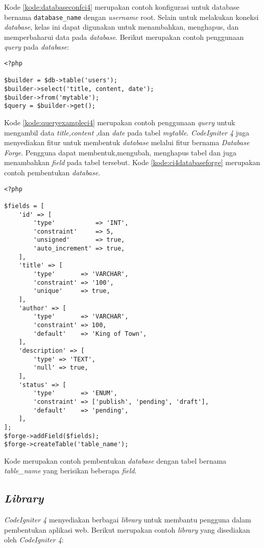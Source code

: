 Kode \ref{kode:databaseconfci4} merupakan contoh konfigurasi untuk database bernama \verb|database_name| dengan \textit{username} root. Selain untuk melakukan koneksi \textit{database}, kelas ini dapat digunakan untuk menambahkan, menghapus, dan memperbaharui data pada \textit{database}. Berikut merupakan contoh penggunaan \textit{query} pada \textit{database}:

\begin{lstlisting}[caption=Contoh konfigurasi \textit{database} pada \textit{CodeIgniter 4}. ,label=kode:queryexampleci4]
<?php

$builder = $db->table('users');
$builder->select('title, content, date');
$builder->from('mytable');
$query = $builder->get();
\end{lstlisting}
Kode \ref{kode:queryexampleci4} merupakan contoh penggunaan \textit{query} untuk mengambil data \textit{title,content} ,dan \textit{date} pada tabel \textit{mytable}. \textit{CodeIgniter 4} juga menyediakan fitur untuk membentuk \textit{database} melalui fitur bernama \textit{Database Forge}. Pengguna dapat membentuk,mengubah, menghapus tabel dan juga menambahkan \textit{field} pada tabel tersebut. Kode \ref{kode:ci4databaseforge} merupakan contoh pembentukan \textit{database}.
\begin{lstlisting}[caption=Contoh pembentukan tabel melalui \textit{database forge}. ,label=kode:ci4databaseforge]
<?php

$fields = [
    'id' => [
        'type'           => 'INT',
        'constraint'     => 5,
        'unsigned'       => true,
        'auto_increment' => true,
    ],
    'title' => [
        'type'       => 'VARCHAR',
        'constraint' => '100',
        'unique'     => true,
    ],
    'author' => [
        'type'       => 'VARCHAR',
        'constraint' => 100,
        'default'    => 'King of Town',
    ],
    'description' => [
        'type' => 'TEXT',
        'null' => true,
    ],
    'status' => [
        'type'       => 'ENUM',
        'constraint' => ['publish', 'pending', 'draft'],
        'default'    => 'pending',
    ],
];
$forge->addField($fields);
$forge->createTable('table_name');
\end{lstlisting}
Kode merupakan contoh pembentukan \textit{database} dengan tabel bernama \textit{table\_name} yang berisikan beberapa \textit{field}.

\subsection{\textit{Library}}
\textit{CodeIgniter 4} menyediakan berbagai \textit{library} untuk membantu pengguna dalam pembentukan aplikasi web. Berikut merupakan contoh \textit{library} yang disediakan oleh \textit{CodeIgniter 4}:

